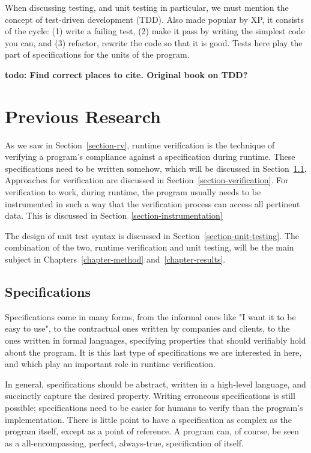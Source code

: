 \documentclass[a4paper,11pt]{kth-mag}
\newcommand{\todo}[1]{\textbf{todo: #1}}
\begin{document}
When discussing testing, and unit testing in particular, we must mention the
concept of test-driven development (TDD). Also made popular by XP, it consists
of the cycle: (1) write a failing test, (2) make it pass by writing the
simplest code you can, and (3) refactor, rewrite the code so that it is good.
Tests here play the part of specifications for the units of the program.

\todo{Find correct places to cite. Original book on TDD?}





\pagestyle{newchap}
\chapter{Previous Research} \label{chapter-previous-research}

As we saw in Section~\ref{section-rv}, runtime verification is the technique of
verifying a program's compliance against a specification during runtime. These
specifications need to be written somehow, which will be discussed in
Section~\ref{section-specifications}. Approaches for verification are discussed
in Section~\ref{section-verification}. For verification to work, during
runtime,
the program usually needs to be instrumented in such a way that the
verification process can access all pertinent data. This is discussed in
Section~\ref{section-instrumentation}

The design of unit test syntax is discussed in
Section~\ref{section-unit-testing}. The combination of the two, runtime
verification and unit testing, will be the main subject in
Chapters~\ref{chapter-method} and~\ref{chapter-results}.


\section{Specifications} \label{section-specifications}

Specifications come in many forms, from the informal ones like "I want it to be
easy to use", to the contractual ones written by companies and clients, to the
ones written in formal languages, specifying properties that should verifiably
hold about the program. It is this last type of specifications we are
interested in here, and which play an important role in runtime verification.

In general, specifications should be abstract, written in a high-level
language, and succinctly capture the desired property. Writing erroneous
specifications is still possible; specifications need to be easier for humans
to verify than the program's implementation. There is little point to have a
specification as complex as the program itself, except as a point of reference.
A program can, of course, be seen as a all-encompassing, perfect, always-true,
specification of itself.
\end{document}
